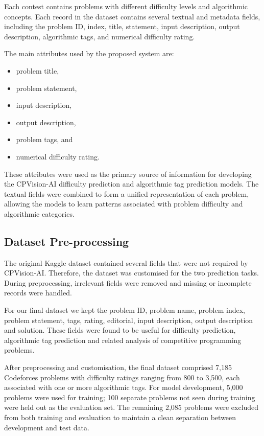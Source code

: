 \documentclass[conference]{IEEEtran}
\begin{document}
Each contest contains problems with different difficulty levels and algorithmic concepts. Each record in the dataset contains several textual and metadata fields, including the problem ID, index, title, statement, input description, output description, algorithmic tags, and numerical difficulty rating.

The main attributes used by the proposed system are:

\begin{itemize}
\item problem title,
\item problem statement,
\item input description,
\item output description,
\item problem tags, and
\item numerical difficulty rating.
\end{itemize}

These attributes were used as the primary source of information for developing the CPVision-AI difficulty prediction and algorithmic tag prediction models. The textual fields were combined to form a unified representation of each problem, allowing the models to learn patterns associated with problem difficulty and algorithmic categories.


\subsection{Dataset Pre-processing}
The original Kaggle dataset \cite{kagglecodeforces} contained several fields
that were not required by CPVision-AI. Therefore, the dataset was customised
for the two prediction tasks. During preprocessing, irrelevant fields were
removed and missing or incomplete records were handled.

For our final dataset we kept the problem ID, problem name, problem index, problem statement, tags, rating, editorial, input description, output description and solution. These fields were found to be useful for difficulty prediction, algorithmic tag prediction and related analysis of competitive programming problems.

After preprocessing and customisation, the final dataset comprised 7,185
Codeforces problems with difficulty ratings ranging from 800 to 3{,}500, each
associated with one or more algorithmic tags. For model development, 5,000
problems were used for training; 100 separate problems not seen during
training were held out as the evaluation set. The remaining 2,085 problems
were excluded from both training and evaluation to maintain a clean
separation between development and test data.
\end{document}
